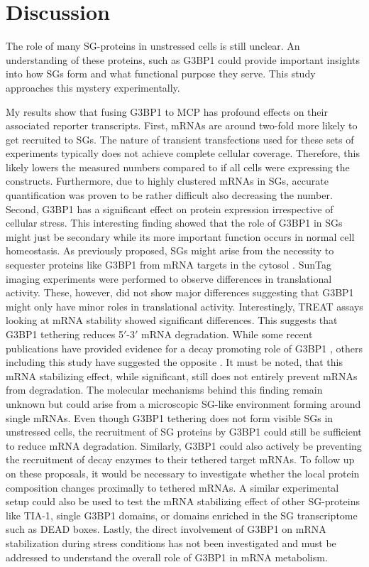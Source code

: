 \chapter{Discussion}


The role of many SG-proteins in unstressed cells is still unclear.
An understanding of these proteins, such as G3BP1 could provide important insights into how SGs form and what functional purpose they serve.
This study approaches this mystery experimentally.

My results show that fusing G3BP1 to MCP has profound effects on their associated reporter transcripts.
First, mRNAs are around two-fold more likely to get recruited to SGs.
The nature of transient transfections used for these sets of experiments typically does not achieve complete cellular coverage.
Therefore, this likely lowers the measured numbers compared to if all cells were expressing the constructs.
Furthermore, due to highly clustered mRNAs in SGs, accurate quantification was proven to be rather difficult also decreasing the number.
Second, G3BP1 has a significant effect on protein expression irrespective of cellular stress.
This interesting finding showed that the role of G3BP1 in SGs might just be secondary while its more important function occurs in normal cell homeostasis.
As previously proposed, SGs might arise from the necessity to sequester proteins like G3BP1 from mRNA targets in the cytosol \cite{fischer_structure-mediated_2020}.
SunTag imaging experiments were performed to observe differences in translational activity.
These, however, did not show major differences suggesting that G3BP1 might only have minor roles in translational activity.
Interestingly, TREAT assays looking at mRNA stability showed significant differences.
This suggests that G3BP1 tethering reduces 5$'$-3$'$ mRNA degradation.
While some recent publications have provided evidence for a decay promoting role of G3BP1 \cite{fischer_structure-mediated_2020, tourriere_rasgap-associated_2001}, others including this study have suggested the opposite \cite{aulas_g3bp1_2015, bley_stress_2015, laver_rna-binding_2020}.
It must be noted, that this mRNA stabilizing effect, while significant, still does not entirely prevent mRNAs from degradation.
The molecular mechanisms behind this finding remain unknown but could arise from a microscopic SG-like environment forming around single mRNAs.
Even though G3BP1 tethering does not form visible SGs in unstressed cells, the recruitment of SG proteins by G3BP1 could still be sufficient to reduce mRNA degradation.
Similarly, G3BP1 could also actively be preventing the recruitment of decay enzymes to their tethered target mRNAs.
To follow up on these proposals, it would be necessary to investigate whether the local protein composition changes proximally to tethered mRNAs.
A similar experimental setup could also be used to test the mRNA stabilizing effect of other SG-proteins like TIA-1, single G3BP1 domains, or domains enriched in the SG transcriptome such as DEAD boxes.
Lastly, the direct involvement of G3BP1 on mRNA stabilization during stress conditions has not been investigated and must be addressed to understand the overall role of G3BP1 in mRNA metabolism.

